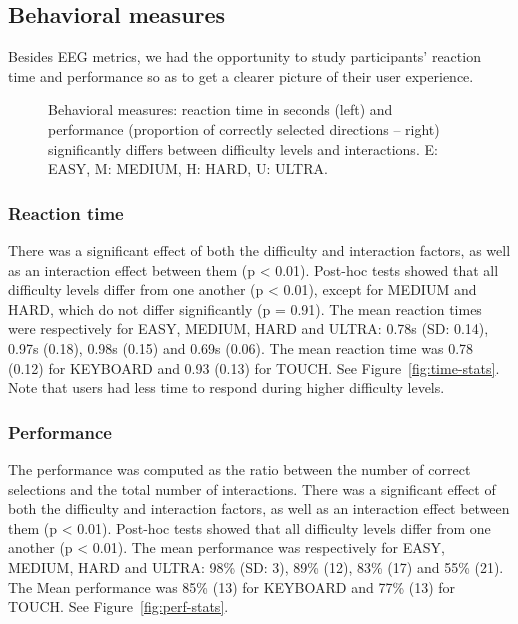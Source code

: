 \documentclass[]{sigchi}
\begin{document}
\subsection{Behavioral measures}\label{behavioral-measures}

Besides EEG metrics, we had the opportunity to study participants'
reaction time and performance so as to get a clearer picture of their
user experience.

\begin{figure}
\centering
{}
\caption{Behavioral measures: reaction time in seconds (left) and
performance (proportion of correctly selected directions -- right)
significantly differs between difficulty levels and interactions. E:
EASY, M: MEDIUM, H: HARD, U: ULTRA.}\label{fig:behav-stats}
\end{figure}

\subsubsection{Reaction time}\label{reaction-time}

There was a significant effect of both the difficulty and interaction
factors, as well as an interaction effect between them (p \textless{}
0.01). Post-hoc tests showed that all difficulty levels differ from one
another (p \textless{} 0.01), except for MEDIUM and HARD, which do not
differ significantly (p = 0.91). The mean reaction times were
respectively for EASY, MEDIUM, HARD and ULTRA: 0.78s (SD: 0.14), 0.97s
(0.18), 0.98s (0.15) and 0.69s (0.06). The mean reaction time was 0.78
(0.12) for KEYBOARD and 0.93 (0.13) for TOUCH. See
Figure~\ref{fig:time-stats}. Note that users had less time to respond
during higher difficulty levels.

\subsubsection{Performance}\label{performance}

The performance was computed as the ratio between the number of correct
selections and the total number of interactions. There was a significant
effect of both the difficulty and interaction factors, as well as an
interaction effect between them (p \textless{} 0.01). Post-hoc tests
showed that all difficulty levels differ from one another (p \textless{}
0.01). The mean performance was respectively for EASY, MEDIUM, HARD and
ULTRA: 98\% (SD: 3), 89\% (12), 83\% (17) and 55\% (21). The Mean
performance was 85\% (13) for KEYBOARD and 77\% (13) for TOUCH. See
Figure~\ref{fig:perf-stats}.
\end{document}
